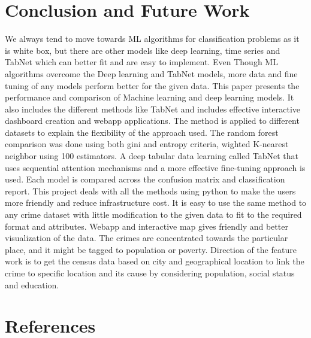 \documentclass[conference,final,]{IEEEtran}
\begin{document}
\section{Conclusion and Future Work}\label{conclusion-and-future-work}

We always tend to move towards ML algorithms for classification problems
as it is white box, but there are other models like deep learning, time
series and TabNet which can better fit and are easy to implement. Even
Though ML algorithms overcome the Deep learning and TabNet models, more
data and fine tuning of any models perform better for the given data.
This paper presents the performance and comparison of Machine learning
and deep learning models. It also includes the different methods like
TabNet and includes effective interactive dashboard creation and webapp
applications. The method is applied to different datasets to explain the
flexibility of the approach used. The random forest comparison was done
using both gini and entropy criteria, wighted K-nearest neighbor using
100 estimators. A deep tabular data learning called TabNet that uses
sequential attention mechanisms and a more effective fine-tuning
approach is used. Each model is compared across the confusion matrix and
classification report. This project deals with all the methods using
python to make the users more friendly and reduce infrastructure cost.
It is easy to use the same method to any crime dataset with little
modification to the given data to fit to the required format and
attributes. Webapp and interactive map gives friendly and better
visualization of the data. The crimes are concentrated towards the
particular place, and it might be tagged to population or poverty.
Direction of the feature work is to get the census data based on city
and geographical location to link the crime to specific location and its
cause by considering population, social status and education.

\section*{References}\label{references}
\end{document}
